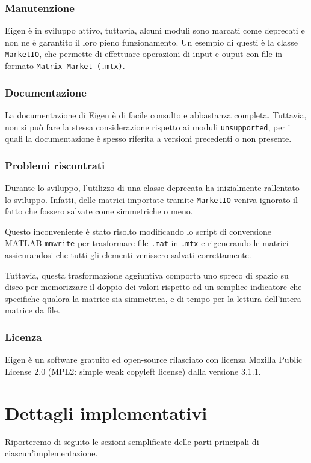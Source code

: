 \documentclass[11pt,italian]{article}
\begin{document}
\subsubsection{Manutenzione}
Eigen è in sviluppo attivo, tuttavia, alcuni moduli sono marcati come deprecati e non ne è garantito il loro pieno funzionamento. Un esempio di questi è la classe \lstinline{MarketIO}, che permette di effettuare operazioni di input e ouput con file in formato \lstinline{Matrix Market (.mtx)}.

\subsubsection{Documentazione}
La documentazione di Eigen è di facile consulto e abbastanza completa. Tuttavia, non si può fare la stessa considerazione rispetto ai moduli \lstinline{unsupported}, per i quali la documentazione è spesso riferita a versioni precedenti o non presente.

\subsubsection{Problemi riscontrati}
Durante lo sviluppo, l'utilizzo di una classe deprecata ha inizialmente rallentato lo sviluppo. Infatti, delle matrici importate tramite \lstinline{MarketIO} veniva ignorato il fatto che fossero salvate come simmetriche o meno.

Questo inconveniente è stato risolto modificando lo script di conversione MATLAB \lstinline{mmwrite} per trasformare file \lstinline{.mat} in \lstinline{.mtx} e rigenerando le matrici assicurandosi che tutti gli elementi venissero salvati correttamente.

Tuttavia, questa trasformazione aggiuntiva comporta uno spreco di spazio su disco per memorizzare il doppio dei valori rispetto ad un semplice indicatore che specifiche qualora la matrice sia simmetrica, e di tempo per la lettura dell'intera matrice da file.

\subsubsection{Licenza}
Eigen è un software gratuito ed open-source rilasciato con licenza Mozilla Public License 2.0 (MPL2: simple weak copyleft license) dalla versione 3.1.1.

\newpage
\section{Dettagli implementativi}
Riporteremo di seguito le sezioni semplificate delle parti principali di ciascun'implementazione.
\end{document}
